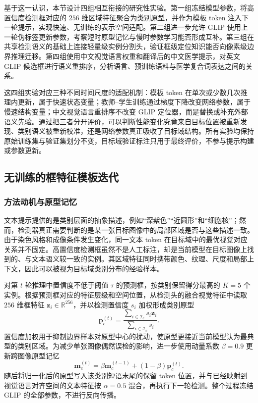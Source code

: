 基于这一认识，本节设计四组相互衔接的研究性实验。第一组冻结模型参数，将高置信度检测框对应的 $256$ 维区域特征聚合为类别原型，并作为模板 token 注入下一轮提示，实现快速、无训练的表示空间适配。第二组进一步允许 GLIP 使用上一轮伪标签更新参数，考察短时原型记忆与慢时参数学习能否形成互补。第三组在共享检测语义的基础上连接轻量级实例分割头，验证框级定位知识能否向像素级边界推理迁移。第四组使用中文视觉语言权重和翻译后的中文医学提示，对英文 GLIP 候选框进行语义重排序，分析语言、预训练语料与医学复合词表达之间的关系。

这四组实验对应三种不同时间尺度的适配机制：模板 token 在单次或少数几次推理内更新，属于快速状态变量；教师--学生训练通过梯度下降改变网络参数，属于慢速结构变量；中文视觉语言重排序不改变 GLIP 定位器，而是替换或补充外部语义先验。通过把三者分开评价，可以判断性能变化究竟来自目标位置被重新发现、类别语义被重新校准，还是网络参数真正吸收了目标域结构。所有实验均保持原始训练集与验证集划分不变，目标域验证标注只用于最终评价，不参与提示构建或参数更新。

\subsection{无训练的框特征模板迭代}

\subsubsection{方法动机与原型记忆}

文本提示提供的是类别层面的抽象描述，例如“深紫色”“近圆形”和“细胞核”；然而，检测器真正需要判断的是某一张目标图像中的局部区域是否与这些描述一致。由于染色风格和成像条件发生变化，同一文本 token 在目标域中的最优视觉对应关系并不固定。高置信度检测框虽然不是人工标注，却是当前模型在目标图像上找到的、与文本语义较一致的实例。其区域特征同时携带颜色、纹理、尺度和局部上下文，因此可以被视为目标域类别分布的经验样本。

对第 $t$ 轮推理中置信度不低于阈值 $\tau$ 的预测框，按类别保留得分最高的 $K=5$ 个实例。根据预测框对应的特征层级和空间位置，从检测头的融合视觉特征中读取 $256$ 维框特征 $\boldsymbol z_i\in\mathbb{R}^{256}$，并以检测置信度 $s_i$ 加权形成类别原型
\begin{equation}
\boldsymbol p_c^{(t)}=
\frac{\sum_{i\in\mathcal I_c}s_i\boldsymbol z_i}
{\sum_{i\in\mathcal I_c}s_i}.
\end{equation}
置信度加权用于抑制边界样本对原型中心的扰动，使原型更接近当前模型认为最典型的类别区域。为减少单张图像偶然误检的影响，进一步使用动量系数 $\beta=0.9$ 更新跨图像原型记忆
\begin{equation}
\boldsymbol m_c^{(t)}
=\beta\boldsymbol m_c^{(t-1)}
 +(1-\beta)\boldsymbol p_c^{(t)}.
\end{equation}
随后将归一化后的原型写入该类别短语末尾的保留 token 位置，并与已经映射到视觉语言对齐空间的文本特征按 $\alpha=0.5$ 混合，再执行下一轮检测。整个过程冻结 GLIP 的全部参数，不进行反向传播。

